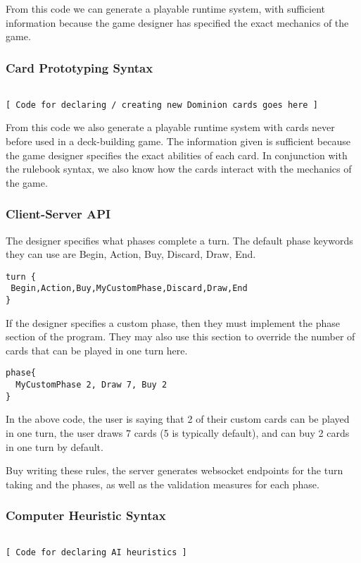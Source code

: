 \documentclass{acm_proc_article-sp}
\begin{document}
From this code we can generate a playable runtime system, with sufficient information
because the game designer has specified the exact mechanics of the game.

\subsubsection{Card Prototyping Syntax}
\begin{verbatim}

[ Code for declaring / creating new Dominion cards goes here ]
\end{verbatim}

From this code we also generate a playable runtime system with cards never before
used in a deck-building game. The information given is sufficient because the
game designer specifies the exact abilities of each card. In conjunction with the
rulebook syntax, we also know how the cards interact with the mechanics of the game.

\subsubsection{Client-Server API}
The designer specifies what phases complete a turn. The default phase keywords they can use are Begin, Action, Buy, Discard, Draw, End. 
\begin{verbatim}
turn {
 Begin,Action,Buy,MyCustomPhase,Discard,Draw,End 
}
\end{verbatim}


If the designer specifies a custom phase, then they must implement the phase section of the program. They may also use this section to override the number of cards that can be played in one turn here.

\begin{verbatim}
phase{
  MyCustomPhase 2, Draw 7, Buy 2
}
\end{verbatim}
In the above code, the user is saying that 2 of their custom cards can be played in one turn, the user draws 7 cards (5 is typically default), and can buy 2 cards in one turn by default.

Buy writing these rules, the server generates websocket endpoints for the turn taking and the phases, as well as the validation measures for each phase.

\subsubsection{Computer Heuristic Syntax}
\begin{verbatim}

[ Code for declaring AI heuristics ]
\end{verbatim}
\end{document}

